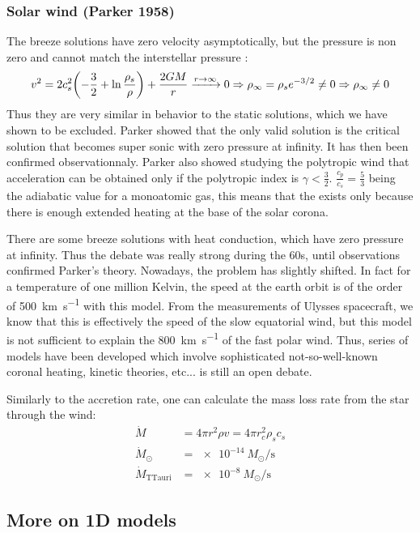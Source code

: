 \documentclass[10pt,a4paper,english,draft]{article}
\let\originalleft\left
\let\originalright\right
\renewcommand{\left}{\mathopen{}\mathclose\bgroup\originalleft}
\renewcommand{\right}{\aftergroup\egroup\originalright}
\begin{document}
\subsubsection{Solar wind (Parker 1958)}
The breeze solutions have zero velocity asymptotically, but the pressure is non zero and cannot match the interstellar pressure :
\begin{equation}
  v^2 = 2 c_s^2 \left( -\frac{3}{2} + \ln \frac{\rho_s}{\rho} \right) + \frac{2GM}{r} \xrightarrow{r\to\infty} 0\Rightarrow \rho_\infty = \rho_s e^{-3/2} \neq 0 \Rightarrow \rho_\infty \neq 0
\end{equation}
Thus they are very similar in behavior to the static solutions, which we have shown to be excluded. Parker showed that the only valid solution is the critical solution that becomes super sonic with zero pressure at infinity. It has then been confirmed observationnaly. Parker also showed studying the polytropic wind that acceleration can be obtained only if the polytropic index is $\gamma < \frac{3}{2}$. $\frac{c_p}{c_s} = \frac{5}{3}$ being the adiabatic value for a monoatomic gas, this means that the exists only because there is enough extended heating at the base of the solar corona.

There are some breeze solutions with heat conduction, which have zero pressure at infinity. Thus the debate was really strong during the 60s, until observations confirmed Parker's theory. Nowadays, the problem has slightly shifted. In fact for a temperature of one million Kelvin, the speed at the earth orbit is of the order of \SI{500}{\km\per\s} with this model. From the measurements of Ulysses spacecraft, we know that this is effectively the speed of the slow equatorial wind, but this model is not sufficient to explain the \SI{800}{\km\per\s} of the fast polar wind. Thus, series of models have been developed which involve sophisticated not-so-well-known coronal heating, kinetic theories, etc... is still an open debate.

Similarly to the accretion rate, one can calculate the mass loss rate from the star through the wind:
\begin{align}
  \dot{M} & = 4\pi r^2\rho v = 4\pi r^2_c\rho_sc_s \\
  \dot{M}_\odot & = \SI{e-14}{M_\odot\per\s} \\
  \dot{M}_\mathrm{TTauri} &= \SI{e-8}{M_\odot\per\s}
\end{align}

\subsection{More on 1D models}
\end{document}
